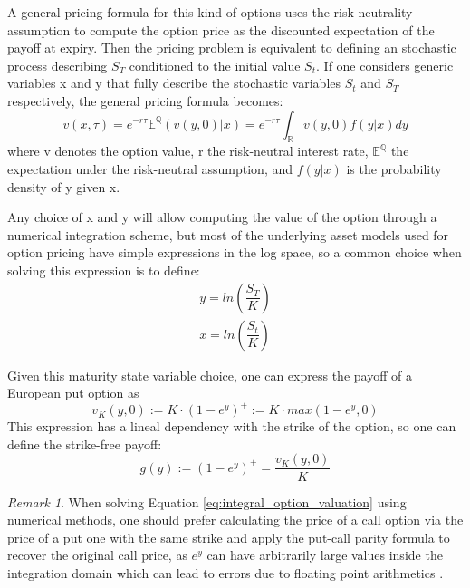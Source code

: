\documentclass[12,twoside]{mammeTFM}
\theoremstyle{definition}
\theoremstyle{remark}
\newtheorem{remark}[thm]{Remark}
\newcommand{\E}{\ensuremath{\mathbb{E}}}
\newcommand{\Q}{\ensuremath{\mathbb{Q}}}
\newcommand{\R}{\ensuremath{\mathbb{R}}}
\begin{document}
A general pricing formula for this kind of options uses the risk-neutrality assumption to compute the option price as the discounted expectation of the payoff at expiry. Then the pricing problem is equivalent to defining an stochastic process describing $S_T$ conditioned to the initial value $S_t$. If one considers generic variables x and y that fully describe the stochastic variables $S_t$ and $S_T$ respectively, the general pricing formula becomes:
\begin{equation}
\label{eq:integral_option_valuation}
v(x, \tau)  = e^{-r \tau}\E^{\Q}(v(y, 0)|x)  = e^{-r\tau} \int_{\R}v(y,0)f(y|x)dy
\end{equation}
where v denotes the option value, r the risk-neutral interest rate, $\E^{\Q}$ the expectation under the risk-neutral assumption, and $f(y|x)$ is the probability density of y given x.

Any choice of x and y will allow computing the value of the option through a numerical integration scheme, but most of the underlying asset models used for option pricing have simple expressions in the log space, so a common choice when solving this expression is to define:
\begin{align}
\label{eq:y}
y = ln \left(\dfrac{S_T}{K} \right) \\
\label{eq:x}
x = ln \left(\dfrac{S_t}{K} \right)
\end{align}

Given this maturity state variable choice, one can express the payoff of a European put option as
\begin{equation} \label{eq:european_payoff}
v_{K}(y, 0) := K \cdot (1 - e^y)^{+} := K \cdot max(1 - e^y, 0)
\end{equation}
This expression has a lineal dependency with the strike of the option, so one can define the strike-free payoff:
\begin{equation}
g(y) := (1 - e^y)^{+} = \dfrac{v_{K}(y, 0)}{K}
\end{equation}

\begin{remark}
When solving Equation \ref{eq:integral_option_valuation} using numerical methods, one should prefer calculating the price of a call option via the price of a put one with the same strike and apply the put-call parity formula to recover the original call price, as $e^y$ can have arbitrarily large values inside the integration domain which can lead to errors due to floating point arithmetics \cite{mar17}.
\end{remark}
\end{document}
